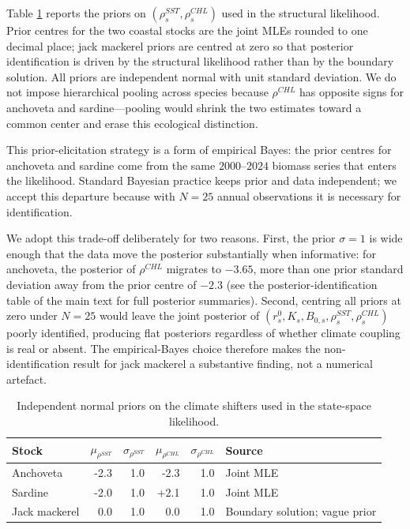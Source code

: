 \documentclass[
  11pt,
]{article}
\begin{document}
Table \ref{tab:stress-priors} reports the priors on
\((\rho_s^{SST}, \rho_s^{CHL})\) used in the structural likelihood.
Prior centres for the two coastal stocks are the joint MLEs rounded to
one decimal place; jack mackerel priors are centred at zero so that posterior
identification is driven by the structural likelihood rather than by
the boundary solution. All priors are independent normal with unit
standard deviation. We do not impose hierarchical pooling across
species because \(\rho^{CHL}\) has opposite signs for anchoveta and
sardine---pooling would shrink the two estimates toward a common
center and erase this ecological distinction.

This prior-elicitation strategy is a form of empirical Bayes: the
prior centres for anchoveta and sardine come from the same \(2000\)--\(2024\)
biomass series that enters the likelihood. Standard Bayesian practice
keeps prior and data independent; we accept this departure because
with \(N=25\) annual observations it is necessary for identification.

We adopt this trade-off deliberately for two reasons. First, the prior
\(\sigma = 1\) is wide enough that the data move the posterior
substantially when informative: for anchoveta, the posterior of
\(\rho^{CHL}\) migrates to \(-3.65\), more than one prior standard
deviation away from the prior centre of \(-2.3\) (see the
posterior-identification table of the main text for full posterior
summaries). Second,
centring all priors at zero under \(N=25\) would leave the joint
posterior of \((r_s^{0}, K_s, B_{0,s}, \rho_s^{SST}, \rho_s^{CHL})\)
poorly identified, producing flat posteriors regardless of whether
climate coupling is real or absent. The empirical-Bayes choice
therefore makes the non-identification result for jack mackerel a
substantive finding, not a numerical artefact.

\begin{table}[!h]
\centering
\caption{\label{tab:stress-priors-table}Independent normal priors on the climate shifters used in the state-space likelihood. \label{tab:stress-priors}}
\centering
\fontsize{10}{12}\selectfont
\begin{tabular}[t]{lrrrrl}
\toprule
Stock & $\mu_{\rho^{SST}}$ & $\sigma_{\rho^{SST}}$ & $\mu_{\rho^{CHL}}$ & $\sigma_{\rho^{CHL}}$ & Source\\
\midrule
Anchoveta & -2.3 & 1.0 & -2.3 & 1.0 & Joint MLE\\
Sardine & -2.0 & 1.0 & +2.1 & 1.0 & Joint MLE\\
Jack mackerel & 0.0 & 1.0 & 0.0 & 1.0 & Boundary solution; vague prior\\
\bottomrule
\end{tabular}
\end{table}
\end{document}
